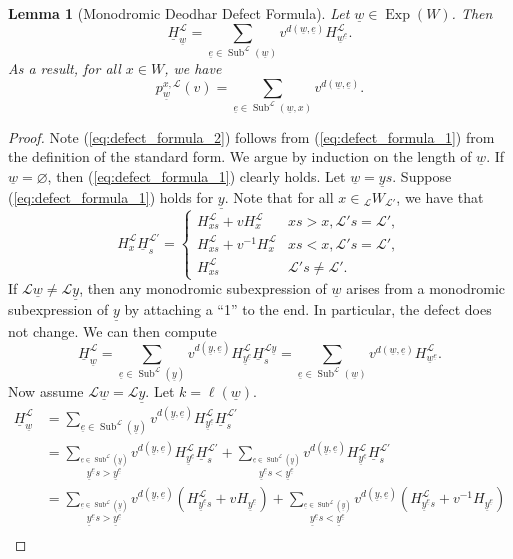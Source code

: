 \documentclass{amsart}
\newcommand{\scrL}{\mathcal{L}}
\newcommand{\uH}{\underline{H}}
\DeclareMathOperator{\Exp}{Exp}
\DeclareMathOperator{\Subexp}{Sub}
\newcommand{\W}[2]{{}_{#1}W_{#2}}
\newcommand{\ue}{\underline{e}}
\newcommand{\uw}{\underline{w}}
\newcommand{\uy}{\underline{y}}
\renewcommand{\emptyset}{\varnothing}
\newtheorem{lemma}[subsubsection]{Lemma}
\theoremstyle{definition}
\numberwithin{equation}{subsection}
\begin{document}
\begin{lemma}[Monodromic Deodhar Defect Formula]\label{lem:defect_formula_for_pwx}
    Let $\uw \in \Exp (W)$. Then
    \begin{equation}\label{eq:defect_formula_1}
        \uH_{\uw}^{\scrL} = \sum_{\ue \in \Subexp^{\scrL} (\uw)} v^{d(\uw,\ue)} H_{\uw^{\ue}}^{\scrL}.
    \end{equation}
    As a result, for all $x\in W$, we have 
    \begin{equation}\label{eq:defect_formula_2}
        p_{\uw}^{x, \scrL} (v) = \sum_{\ue \in \Subexp^{\scrL} (\uw, x)} v^{d(\uw, \ue)}.
    \end{equation}
\end{lemma}
\begin{proof}
    Note (\ref{eq:defect_formula_2}) follows from (\ref{eq:defect_formula_1}) from the definition of the standard form.
    We argue by induction on the length of $\uw$. If $\uw = \emptyset$, then (\ref{eq:defect_formula_1}) clearly holds.
    Let $\uw = \uy s$.
    Suppose (\ref{eq:defect_formula_1}) holds for $\uy$.
    Note that for all $x \in \W{\scrL}{\scrL'}$, we have that
    \[H_x^{\scrL} \uH_{s}^{\scrL'} = \begin{cases} H_{xs}^{\scrL} + vH_x^{\scrL} & xs > x, \scrL' s = \scrL', \\ H_{xs}^{\scrL} + v^{-1} H_x^{\scrL} & xs < x, \scrL' s = \scrL', \\ H_{xs}^{\scrL} & \scrL' s \neq \scrL'.\end{cases} \]
    If $\scrL \uw \neq \scrL \uy$, then any monodromic subexpression of $\uw$ arises from a monodromic subexpression of $\uy$ by attaching a ``1'' to the end. In particular, the defect does not change.
    We can then compute
    \[ \uH_{\uw}^{\scrL} = \sum_{\ue \in \Subexp^{\scrL} (\uy)} v^{d(\uy,\ue)} H_{\uy^{\ue}}^{\scrL} \uH_{s}^{\scrL \uy} =  \sum_{\ue \in \Subexp^{\scrL} (\uw)} v^{d(\uw,\ue)} H_{\uw^{\ue}}^{\scrL}.\]
    Now assume $\scrL \uw = \scrL \uy$. Let $k = \ell (\uw)$.
    \begin{align*}
        \uH_{\uw}^{\scrL} &= \sum_{\ue \in \Subexp^{\scrL} (\uy)} v^{d(\uy,\ue)} H_{\uy^{\ue}}^{\scrL} \uH_{s}^{\scrL'} \\
        &= \sum_{\stackrel{\ue \in \Subexp^{\scrL} (\uy)}{\uy^{\ue} s > \uy^{\ue}}} v^{d(\uy,\ue)} H_{\uy^{\ue}}^{\scrL} \uH_{s}^{\scrL'} + \sum_{\stackrel{\ue \in \Subexp^{\scrL} (\uy)}{\uy^{\ue} s < \uy^{\ue}}} v^{d(\uy,\ue)} H_{\uy^{\ue}}^{\scrL} \uH_{s}^{\scrL'} \\
        &= \sum_{\stackrel{\ue \in \Subexp^{\scrL} (\uy)}{\uy^{\ue} s > \uy^{\ue}}} v^{d(\uy,\ue)} (H_{\uy^{\ue} s}^{\scrL} + vH_{\uy^{\ue}}) + \sum_{\stackrel{\ue \in \Subexp^{\scrL} (\uy)}{\uy^{\ue} s < \uy^{\ue}}} v^{d(\uy,\ue)} (H_{\uy^{\ue} s}^{\scrL} + v^{-1} H_{\uy^{\ue}}) \\

\end{align*}
\end{proof}
\end{document}
